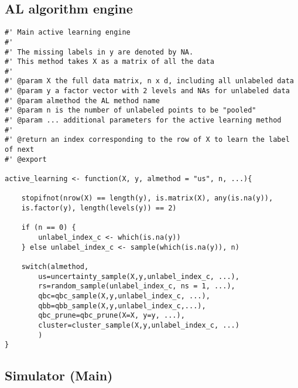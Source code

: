 \subsection{AL algorithm engine}
\label{sec:appendicies:al:simulations:alengine}
{
\begin{lstlisting}
#' Main active learning engine
#'
#' The missing labels in y are denoted by NA.
#' This method takes X as a matrix of all the data
#'
#' @param X the full data matrix, n x d, including all unlabeled data
#' @param y a factor vector with 2 levels and NAs for unlabeled data
#' @param almethod the AL method name
#' @param n is the number of unlabeled points to be "pooled"
#' @param ... additional parameters for the active learning method
#'
#' @return an index corresponding to the row of X to learn the label of next
#' @export

active_learning <- function(X, y, almethod = "us", n, ...){

	stopifnot(nrow(X) == length(y), is.matrix(X), any(is.na(y)),
	is.factor(y), length(levels(y)) == 2)
	
	if (n == 0) {
		unlabel_index_c <- which(is.na(y))
	} else unlabel_index_c <- sample(which(is.na(y)), n)
	
	switch(almethod,
		us=uncertainty_sample(X,y,unlabel_index_c, ...),
		rs=random_sample(unlabel_index_c, ns = 1, ...),
		qbc=qbc_sample(X,y,unlabel_index_c, ...),
		qbb=qbb_sample(X,y,unlabel_index_c,...),
		qbc_prune=qbc_prune(X=X, y=y, ...),
		cluster=cluster_sample(X,y,unlabel_index_c, ...)
		)
}
\end{lstlisting}
}

\subsection{Simulator (Main)}
\label{sec:appendicies:al:simulations:results}